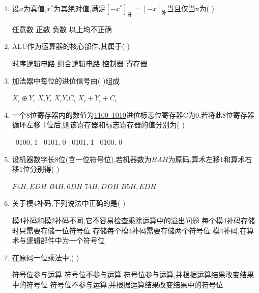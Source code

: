 \documentclass[12pt, a4paper, oneside, UTF8]{ctexbook}
\begin{document}
\begin{enumerate}
    \item 设$x$为真值,$x^{*}$为其绝对值,满足$[-x^*]_{\text{补}}=[-x]_{\text{补}}$当且仅当x为(   ) 
    \begin{choices}
        \task 任意数
        \task 正数 
        \task 负数 
        \task 以上均不正确
    \end{choices}
    

    \item ALU作为运算器的核心部件,其属于(   ) 
    \begin{choices}
        \task 时序逻辑电路
        \task 组合逻辑电路
        \task 控制器 
        \task 寄存器
    \end{choices}
    

    \item \bl 加法器中每位的进位信号由(   )组成
    \begin{choices}
        \task $X_i\oplus Y_i$
        \task $X_iY_i$
        \task $X_iY_iC_i$
        \task $X_i+Y_i+C_i$
    \end{choices}
    

    \item 一个8位寄存器内的数值为\underline{1100\ 1010}进位标志位寄存器C为0,若将此8位寄存器循环左移
    1位后,则该寄存器和标志寄存器的值分别为(   ) 
    \begin{choices}
        \ 0100, 1
        \ 0101, 0
        \ 0101, 1
        \ 0100, 0
    \end{choices}
    

    \item 设机器数字长8位(含一位符号位),若机器数为$BAH$为原码,算术左移1和算术右移1位分别得(   ) 
    \begin{choices}
        \task $F4H,EDH$
        \task $B4H,6DH$
        \task $74H,DDH$
        \task $B5H,EDH$
    \end{choices}
    

    \item 关于模4补码,下列说法中正确的是(   ) 
    \begin{choices}[1]
        \task 模4补码和模2补码不同,它不容易检查乘除运算中的溢出问题
        \task 每个模4补码存储时只需要存储一位符号位
        \task 存储每个模4补码需要存储两个符号位
        \task 模4补码,在算术与逻辑部件中为一个符号位
    \end{choices}


    \item 在原码一位乘法中,(   ) 
    \begin{choices}[1]
        \task 符号位参与运算
        \task 符号位不参与运算
        \task 符号位参与运算,并根据运算结果改变结果中的符号位
        \task 符号位不参与运算,并根据运算结果改变结果中的符号位
    \end{choices}



\end{enumerate}
\end{document}
